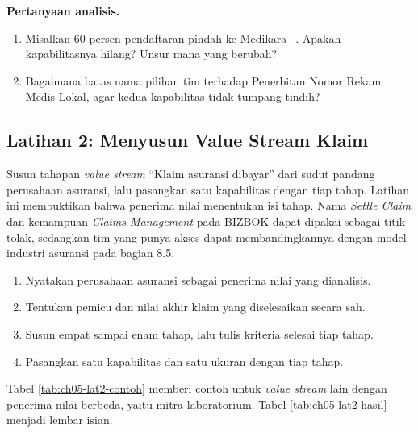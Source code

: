 \textbf{Pertanyaan analisis.}

\begin{enumerate}
  \item Misalkan 60 persen pendaftaran pindah ke Medikara+. Apakah kapabilitasnya hilang? Unsur mana yang berubah?
  \item Bagaimana batas nama pilihan tim terhadap Penerbitan Nomor Rekam Medis Lokal, agar kedua kapabilitas tidak tumpang tindih?
\end{enumerate}

\subsection*{Latihan 2: Menyusun Value Stream Klaim}

Susun tahapan \textit{value stream} ``Klaim asuransi dibayar'' dari sudut pandang perusahaan asuransi, lalu pasangkan satu kapabilitas dengan
tiap tahap. Latihan ini membuktikan bahwa penerima nilai menentukan isi tahap. Nama \textit{Settle Claim} dan kemampuan \textit{Claims
Management} pada BIZBOK \cite{bizbok15} dapat dipakai sebagai titik tolak, sedangkan tim yang punya akses dapat membandingkannya dengan
model industri asuransi pada bagian 8.5.

\begin{enumerate}
  \item Nyatakan perusahaan asuransi sebagai penerima nilai yang dianalisis.
  \item Tentukan pemicu dan nilai akhir klaim yang diselesaikan secara sah.
  \item Susun empat sampai enam tahap, lalu tulis kriteria selesai tiap tahap.
  \item Pasangkan satu kapabilitas dan satu ukuran dengan tiap tahap.
\end{enumerate}

Tabel \ref{tab:ch05-lat2-contoh} memberi contoh untuk \textit{value stream} lain dengan penerima nilai berbeda, yaitu mitra laboratorium.
Tabel \ref{tab:ch05-lat2-hasil} menjadi lembar isian.

